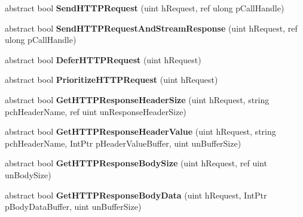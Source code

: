 \begin{DoxyCompactItemize}
abstract bool {\bfseries Send\+H\+T\+T\+P\+Request} (uint h\+Request, ref ulong p\+Call\+Handle)
\item 
\mbox{\label{class_valve_1_1_steamworks_1_1_i_steam_h_t_t_p_a648a5e8e58125e9e31a1ebb5bb08506c}} 
abstract bool {\bfseries Send\+H\+T\+T\+P\+Request\+And\+Stream\+Response} (uint h\+Request, ref ulong p\+Call\+Handle)
\item 
\mbox{\label{class_valve_1_1_steamworks_1_1_i_steam_h_t_t_p_aeedc029de0626593c1642723eb697110}} 
abstract bool {\bfseries Defer\+H\+T\+T\+P\+Request} (uint h\+Request)
\item 
\mbox{\label{class_valve_1_1_steamworks_1_1_i_steam_h_t_t_p_ab851e87f31ac556fe562813f56a0d23c}} 
abstract bool {\bfseries Prioritize\+H\+T\+T\+P\+Request} (uint h\+Request)
\item 
\mbox{\label{class_valve_1_1_steamworks_1_1_i_steam_h_t_t_p_adbf0dbd3e35ffc691d3dda06ccac00a6}} 
abstract bool {\bfseries Get\+H\+T\+T\+P\+Response\+Header\+Size} (uint h\+Request, string pch\+Header\+Name, ref uint un\+Response\+Header\+Size)
\item 
\mbox{\label{class_valve_1_1_steamworks_1_1_i_steam_h_t_t_p_af39c4cde56d629cfce6fbe2aaefd224e}} 
abstract bool {\bfseries Get\+H\+T\+T\+P\+Response\+Header\+Value} (uint h\+Request, string pch\+Header\+Name, Int\+Ptr p\+Header\+Value\+Buffer, uint un\+Buffer\+Size)
\item 
\mbox{\label{class_valve_1_1_steamworks_1_1_i_steam_h_t_t_p_a11ef4ed524479aebd51eda1f51f7eaae}} 
abstract bool {\bfseries Get\+H\+T\+T\+P\+Response\+Body\+Size} (uint h\+Request, ref uint un\+Body\+Size)
\item 
\mbox{\label{class_valve_1_1_steamworks_1_1_i_steam_h_t_t_p_ae6bce94268b0487f9e27c5d1de6859c7}} 
abstract bool {\bfseries Get\+H\+T\+T\+P\+Response\+Body\+Data} (uint h\+Request, Int\+Ptr p\+Body\+Data\+Buffer, uint un\+Buffer\+Size)
\item 

\end{DoxyCompactItemize}
